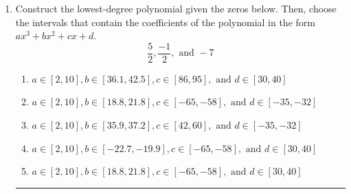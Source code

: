 \documentclass[14pt]{extbook}
\newcommand{\litem}[1]{\item#1\hspace*{-1cm}\rule{\textwidth}{0.4pt}}
\begin{document}
\begin{enumerate}
\litem{
Construct the lowest-degree polynomial given the zeros below. Then, choose the intervals that contain the coefficients of the polynomial in the form $ax^3+bx^2+cx+d$.\[ \frac{5}{2}, \frac{-1}{2}, \text{ and } -7 \]\begin{enumerate}[label=\Alph*.]
\item \( a \in [2, 10], b \in [36.1, 42.5], c \in [86, 95], \text{ and } d \in [30, 40] \)
\item \( a \in [2, 10], b \in [18.8, 21.8], c \in [-65, -58], \text{ and } d \in [-35, -32] \)
\item \( a \in [2, 10], b \in [35.9, 37.2], c \in [42, 60], \text{ and } d \in [-35, -32] \)
\item \( a \in [2, 10], b \in [-22.7, -19.9], c \in [-65, -58], \text{ and } d \in [30, 40] \)
\item \( a \in [2, 10], b \in [18.8, 21.8], c \in [-65, -58], \text{ and } d \in [30, 40] \)


\end{enumerate}}
\end{enumerate}
\end{document}
